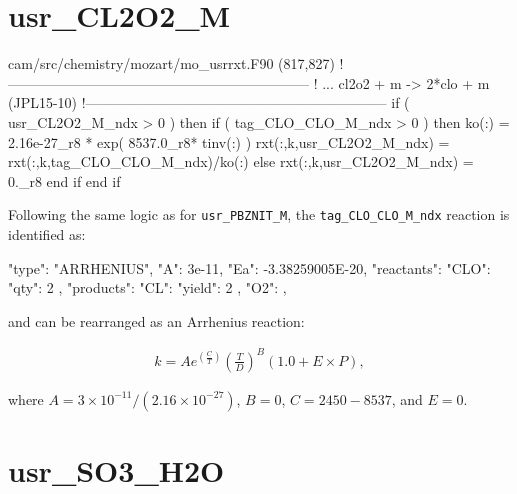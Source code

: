 \documentclass[titlepage]{article}
\begin{document}
\section{usr\_CL2O2\_M}

\begin{blockcode}[commandchars=\\\{\}]
\color{gray}cam/src/chemistry/mozart/mo_usrrxt.F90 (817,827)
!-----------------------------------------------------------------
!   ... cl2o2 + m -> 2*clo + m  (JPL15-10)
!-----------------------------------------------------------------
       if ( usr_CL2O2_M_ndx > 0 ) then
          if ( tag_CLO_CLO_M_ndx > 0 ) then
             ko(:)            = 2.16e-27_r8 * exp( 8537.0_r8* tinv(:) )
             rxt(:,k,usr_CL2O2_M_ndx) = rxt(:,k,tag_CLO_CLO_M_ndx)/ko(:)
          else
             rxt(:,k,usr_CL2O2_M_ndx) = 0._r8
          end if
       end if
\end{blockcode}

Following the same logic as for \verb>usr_PBZNIT_M>, the \verb>tag_CLO_CLO_M_ndx> reaction is identified as:

\begin{blockcode}
        {
          "type": "ARRHENIUS",
          "A": 3e-11,
          "Ea": -3.38259005E-20,
          "reactants": {
            "CLO": { "qty": 2 }
          },
          "products": {
            "CL": { "yield": 2 },
            "O2": { }
          }
        },
\end{blockcode}

\noindent and can be rearranged as an Arrhenius reaction:

\begin{equation}
\begin{split}
k = Ae^{(\frac{C}{T})}(\frac{T}{D})^B(1.0+E \times P),
\end{split}
\end{equation}

\noindent where $A = 3 \times 10^{-11} / \left(2.16 \times 10^{-27}\right)$, $B = 0$, $C = 2450 - 8537$, and $E = 0$.


\section{usr\_SO3\_H2O}
\end{document}
